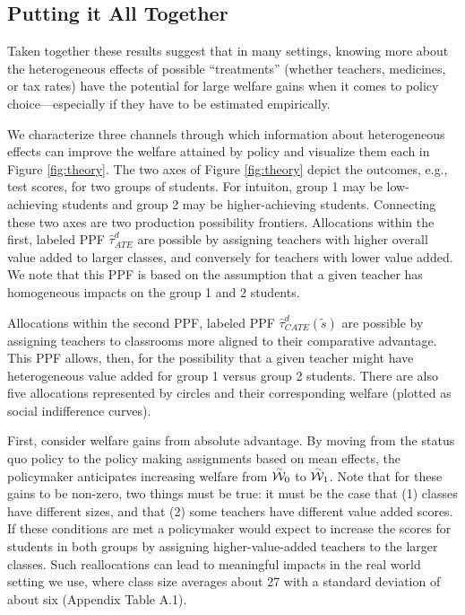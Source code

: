 \documentclass[12pt]{article}
\theoremstyle{definition}
\theoremstyle{definition}
\theoremstyle{definition}
\theoremstyle{definition}
\begin{document}
    \subsection{Putting it All Together}
    Taken together these results suggest that in many settings, knowing more about the heterogeneous effects of possible ``treatments'' (whether teachers, medicines, or tax rates) have the potential for large welfare gains when it comes to policy choice---especially if they have to be estimated empirically.
    
    
    We characterize three channels through which information about heterogeneous effects can improve the welfare attained by policy and visualize them each in Figure \ref{fig:theory}. The two axes of Figure \ref{fig:theory} depict the outcomes, e.g., test scores, for two groups of students. For intuiton, group 1 may be low-achieving students and group 2 may be higher-achieving students. Connecting these two axes are two production possibility frontiers. Allocations within the first, labeled PPF $\hat{\tau}^d_{ATE}$ are possible by assigning teachers with higher overall value added to larger classes, and conversely for teachers with lower value added. We note that this PPF is based on the assumption that a given teacher has homogeneous impacts on the group 1 and 2 students. 
    
    Allocations within the second PPF, labeled PPF $\hat{\tau}^d_{CATE}(\tilde{s})$ are possible by assigning teachers to classrooms more aligned to their comparative advantage. This PPF allows, then, for the possibility that a given teacher might have heterogeneous value added for group 1 versus group 2 students. There are also five allocations represented by circles and their corresponding welfare (plotted as social indifference curves).
    
    First, consider welfare gains from absolute advantage. By moving from the status quo policy to the policy making assignments based on mean effects, the policymaker anticipates increasing welfare from $\accentset{\sim}{\mathcal{W}}_0$ to $\accentset{\sim}{\mathcal{W}}_1$. Note that for these gains to be non-zero, two things must be true: it must be the case that (1) classes have different sizes, and that (2) some teachers have different value added scores. If these conditions are met a policymaker would expect to  increase the scores for students in both groups by assigning higher-value-added teachers to the larger classes. Such reallocations can lead to meaningful impacts in the real world setting we use, where class size averages about 27 with a standard deviation of about six (Appendix Table A.1). 
    
\end{document}
